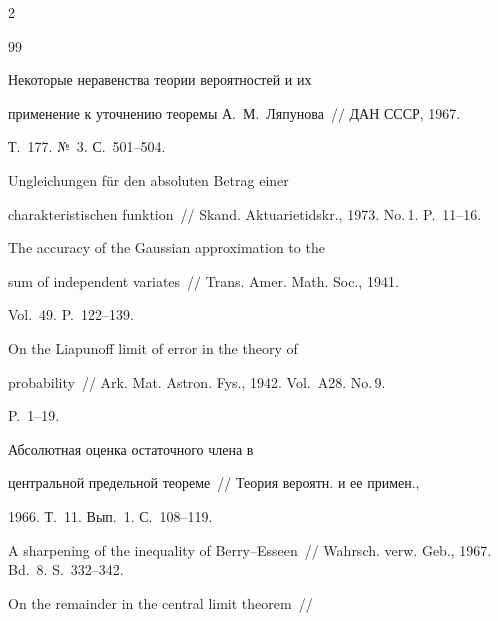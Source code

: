 \begin{multicols}{2}
{{\begin{thebibliography}{99}


Некоторые неравенства теории вероятностей и их

применение к уточнению теоремы А.~М.~Ляпунова~// ДАН СССР, 1967.

Т.~177. №~3. С.~501--504.





Ungleichungen f\"{u}r den absoluten Betrag einer

charakteristischen funktion~// Skand. Aktuarietidskr., 1973. No.\,1. P.~11--16.





The accuracy of the Gaussian approximation to the

sum of independent variates~// Trans. Amer. Math. Soc., 1941.

Vol.~49. P.~122--139.





On the Liapunoff limit of error in the theory of

probability~// Ark. Mat. Astron. Fys., 1942. Vol.~A28. No.\,9.

P.~1--19.





Абсолютная оценка остаточного члена в

центральной предельной теореме~// Теория вероятн. и ее примен.,

1966. Т.~11. Вып.~1. С.~108--119.





A sharpening of the inequality of Berry--Esseen~// Wahrsch. verw. Geb., 1967. Bd.~8. S.~332--342.





On the remainder in the central limit theorem~//


\end{thebibliography}}}
\end{multicols}
